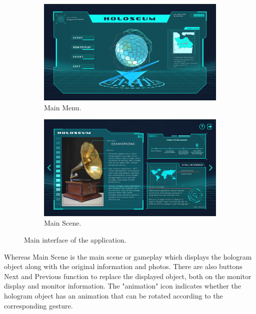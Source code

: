 \documentclass[conference]{IEEEtran}
\begin{document}
		\vspace{-2ex}
		\begin{figure} [h]
			\begin{subfigure}{0.23\textwidth}
				\includegraphics[width=\textwidth]{img/mainmenu.png}
				\caption{Main Menu.\label{fig:mainmenu}}
			\end{subfigure}
			\hspace{0.1em}
			\begin{subfigure}{0.23\textwidth}
				\includegraphics[width=\textwidth]{img/mainscene.png}
				\caption{Main Scene.\label{fig:mainscene}}
			\end{subfigure}
			\vspace{-1ex}
			\caption{Main interface of the application.}
		\end{figure}
		\vspace{-2ex}
		
		Whereas Main Scene is the main scene or gameplay which displays the hologram object along with the original information and photos. There are also buttons Next and Previous function to replace the displayed object, both on the monitor display and monitor information. The "animation" icon indicates whether the hologram object has an animation that can be rotated according to the corresponding gesture. 
		
\end{document}
